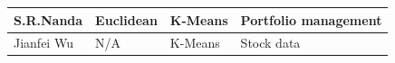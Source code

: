 \begin{landscape}
\begin{table}[ht]
\begin{tabular}{|l|l|l|l|}
S.R.Nanda                                                      & Euclidean                                                                                                                                    & K-Means                                                                                  & Portfolio management                                                                            \\ \hline
Jianfei Wu                                                     & N/A                                                                                                                                          & K-Means                                                                                  & Stock data                                                                                      \\ \hline
\end{tabular}
\end{table}
\end{landscape}



